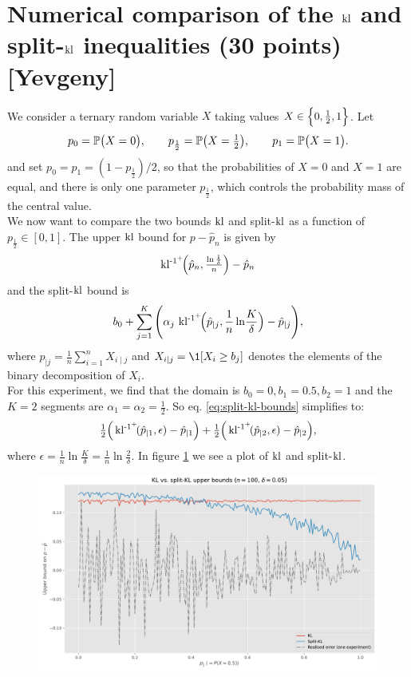 \section{Numerical comparison of the \texorpdfstring{$\operatorname{kl}$}{kl} and split-\texorpdfstring{$\operatorname{kl}$}{kl} inequalities (30 points) [Yevgeny]}

We consider a ternary random variable $X$ taking values $X \in \Bigl\{0,\tfrac12,1\Bigr\}$.
Let
\[
  p_{0}= \P \bigl(X=0\bigr), \qquad
  p_{\frac12}= \P\bigl(X=\tfrac12\bigr), \qquad
  p_{1}= \P \bigl(X=1\bigr).
\]
and set \(p_{0}=p_{1}=(1-p_{\frac12})/2\), so that the probabilities of \(X=0\) and \(X=1\) are equal, and there is only one parameter \(p_{\frac12}\), which controls the 
probability mass of the central value.
\\[2mm]
We now want to compare the two bounds $\operatorname{kl}$ and split-$\operatorname{kl}$ as a function of \(p_{\frac12}\in[0,1]\). The upper $\operatorname{kl}$ bound for \(p-\hat p_{n}\) is given by
\[
\operatorname{kl^{-1^+}\!}\Bigl(\hat p_{n},
        \tfrac{\ln\frac{1}{\delta}}{n}
  \Bigr)
  -\hat p_{n}
\]
and the split-$\operatorname{kl}$ bound is
\begin{equation} \label{eq:split-kl-bounds}
   b_{0}+\sum_{j=1}^{K} \Bigg(  \alpha_{j}\,
   \operatorname{kl^{-1^+}\!}\Bigl(\hat{p}_{\mid j},
                       \frac{1}{n}\ln\!\frac{K}{\delta}\Bigr) - \hat{p}_{\mid j} \Bigg),
\end{equation}
where $\hat{p}_{\mid j}= \frac{1}{n}\sum_{i=1}^{n}X_{i\mid j}$ and $X_{i\mid j}= \1[X_{i}\ge b_{j}]$ denotes the elements of the binary decomposition of $X_{i}$.
\\[2mm]
For this experiment, we find that the domain is $b_0=0, b_1 = 0.5, b_2=1$ and the $K=2$ segments are $\alpha_1=\alpha_2=\frac{1}{2}$. So eq. \ref{eq:split-kl-bounds} simplifies to:
\[
\tfrac{1}{2} \Big( \operatorname{kl^{-1^+}\!}(\hat{p}_{\mid 1}, \epsilon ) - \hat{p}_{\mid 1} \Big)
+ \tfrac{1}{2}\Big( \operatorname{kl^{-1^+}\!}(\hat{p}_{ \mid2}, \epsilon ) - \hat{p}_{\mid 2} \Big),   
\]
where $\epsilon = \tfrac{1}{n} \ln \tfrac{K}{\delta}  = \tfrac{1}{n} \ln \tfrac{2}{\delta}.$
In figure \ref{fig:splitkl} we see a plot of $\operatorname{kl}$ and split-$\operatorname{kl}$.

\begin{figure}[ht]
\includegraphics[scale=0.5]{figures/splitkl_vs_kl.pdf}
\label{fig:splitkl}
\end{figure}


